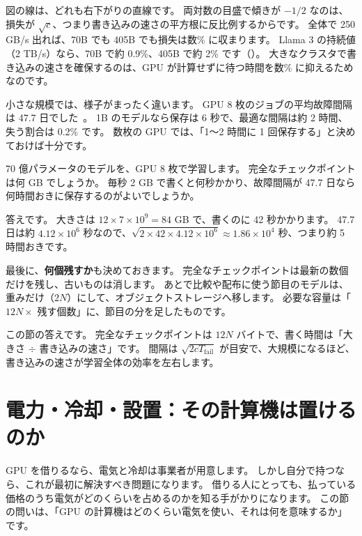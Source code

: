 図の線は、どれも右下がりの直線です。
両対数の目盛で傾きが $-1/2$ なのは、損失が $\sqrt{c}$、つまり書き込みの速さの平方根に反比例するからです。
全体で 250 GB/s 出れば、70B でも 405B でも損失は数\% に収まります。
Llama 3 の持続値（2 TB/s）なら、70B で約 0.9\%、405B で約 2\% です（）。
大きなクラスタで書き込みの速さを確保するのは、GPU が計算せずに待つ時間を数\% に抑えるためなのです。

小さな規模では、様子がまったく違います。
GPU 8 枚のジョブの平均故障間隔は 47.7 日でした~\cite{kokolis2024reliability}。
1B のモデルなら保存は 6 秒で、最適な間隔は約 2 時間、失う割合は 0.2\% です。
数枚の GPU では、「1〜2 時間に 1 回保存する」と決めておけば十分です。

\begin{quiz}
70 億パラメータのモデルを、GPU 8 枚で学習します。
完全なチェックポイントは何 GB でしょうか。
毎秒 2 GB で書くと何秒かかり、故障間隔が 47.7 日なら何時間おきに保存するのがよいでしょうか。
\end{quiz}

答えです。
大きさは $12\times7\times10^{9}=84$ GB で、書くのに 42 秒かかります。
47.7 日は約 $4.12\times10^{6}$ 秒なので、$\sqrt{2\times42\times4.12\times10^{6}}\approx1.86\times10^{4}$ 秒、つまり約 5 時間おきです。

最後に、\textbf{何個残すか}も決めておきます。
完全なチェックポイントは最新の数個だけを残し、古いものは消します。
あとで比較や配布に使う節目のモデルは、重みだけ（$2N$）にして、オブジェクトストレージへ移します。
必要な容量は「$12N\times$ 残す個数」に、節目の分を足したものです。

この節の答えです。
完全なチェックポイントは $12N$ バイトで、書く時間は「大きさ $\div$ 書き込みの速さ」です。
間隔は $\sqrt{2cT_{\mathrm{fail}}}$ が目安で、大規模になるほど、書き込みの速さが学習全体の効率を左右します。

\section{電力・冷却・設置：その計算機は置けるのか}\label{sec:infra-power}

GPU を借りるなら、電気と冷却は事業者が用意します。
しかし自分で持つなら、これが最初に解決すべき問題になります。
借りる人にとっても、払っている価格のうち電気がどのくらいを占めるのかを知る手がかりになります。
この節の問いは、「GPU の計算機はどのくらい電気を使い、それは何を意味するか」です。

